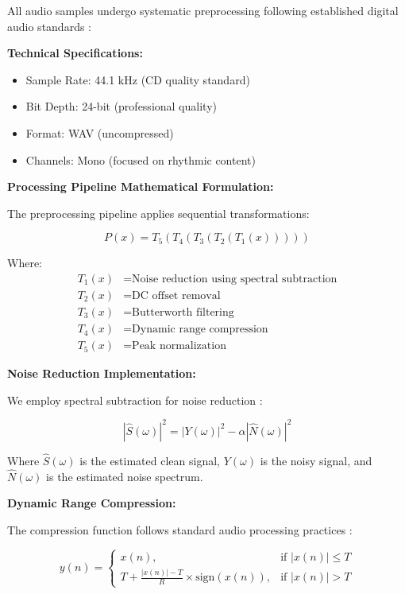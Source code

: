 \documentclass[12pt,a4paper]{article}
\begin{document}
All audio samples undergo systematic preprocessing following established digital audio standards \citep{pohlmann2005principles, watkinson2001art}:

\textbf{Technical Specifications:}
\begin{itemize}
\item Sample Rate: 44.1 kHz (CD quality standard)
\item Bit Depth: 24-bit (professional quality)
\item Format: WAV (uncompressed)
\item Channels: Mono (focused on rhythmic content)
\end{itemize}

\textbf{Processing Pipeline Mathematical Formulation:}

The preprocessing pipeline applies sequential transformations:

\begin{equation}
P(x) = T_5(T_4(T_3(T_2(T_1(x)))))
\end{equation}

Where:
\begin{align}
T_1(x) &= \text{Noise reduction using spectral subtraction} \\
T_2(x) &= \text{DC offset removal} \\
T_3(x) &= \text{Butterworth filtering} \\
T_4(x) &= \text{Dynamic range compression} \\
T_5(x) &= \text{Peak normalization}
\end{align}

\textbf{Noise Reduction Implementation:}

We employ spectral subtraction for noise reduction \citep{boll1979suppression, berouti1979enhancement}:

\begin{equation}
|\hat{S}(\omega)|^2 = |Y(\omega)|^2 - \alpha|\hat{N}(\omega)|^2
\end{equation}

Where $\hat{S}(\omega)$ is the estimated clean signal, $Y(\omega)$ is the noisy signal, and $\hat{N}(\omega)$ is the estimated noise spectrum.

\textbf{Dynamic Range Compression:}

The compression function follows standard audio processing practices \citep{katz2002mastering}:

\begin{equation}
y(n) = \begin{cases}
x(n), & \text{if } |x(n)| \leq T \\
T + \frac{|x(n)| - T}{R} \times \text{sign}(x(n)), & \text{if } |x(n)| > T
\end{cases}
\end{equation}
\end{document}

